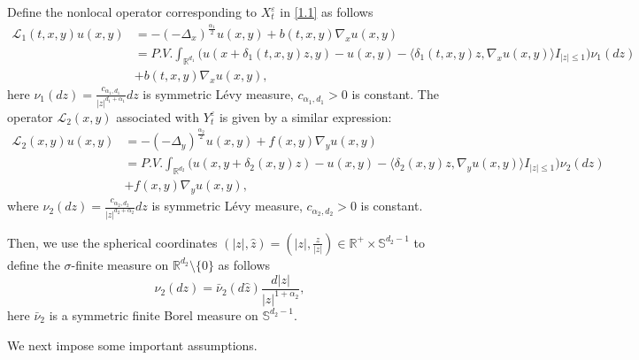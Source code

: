 \documentclass[11pt,reqno]{amsart}
\numberwithin{equation}{section}
\newcommand{\s}{\mathbb{S}}
\begin{document}
Define the nonlocal operator corresponding to $X_t^\varepsilon$ in \eqref{1.1} as follows
\begin{align*} 
	\mathcal{L}_{1}(t,x,y)u(x,y)&=	-(-\Delta_{x})^{\frac{\alpha_{1}}{2}}u(x,y)+b(t,x,y)\nabla_{x}u(x,y)\\
	&=P.V.\int_{\mathbb{R}^{d_{1}}}\Big(u(x+\delta_{1}(t,x,y)z,y)-u(x,y)-\langle\delta_{1}(t,x,y)z,\nabla_{x}u(x,y)\rangle I_{|z|\leq1}\Big)\nu_{1}(dz)\\
	&+b(t,x,y)\nabla_{x}u(x,y),
	\end{align*}
	here $\nu_{1}(dz)=\frac{c_{\alpha_{1},d_{1}}}{|z|^{d_{1}+\alpha_{1}}}dz$ is symmetric L\'{e}vy measure, $c_{\alpha_{1},d_{1}}>0$ is constant. The operator
	$ \mathcal{L}_{2}(x,y)$  associated with $Y_t^\varepsilon$  is given by a similar expression:
\begin{align}\label{l2}
	 \mathcal{L}_{2}(x,y)u(x,y)&=	-(-\Delta_{y})^{\frac{\alpha_{2}}{2}}u(x,y)+f(x,y)\nabla_{y}u(x,y)\nonumber\\
	 &=P.V.\int_{\mathbb{R}^{d_{2}}}\Big(u(x,y+\delta_{2}(x,y)z)-u(x,y)-\langle\delta_{2}(x,y)z,\nabla_{y}u(x,y)\rangle I_{|z|\leq1}\Big)\nu_{2}(dz)\nonumber\\
	 &+f(x,y)\nabla_{y}u(x,y),
	 \end{align}
where $\nu_{2}(dz)=\frac{c_{\alpha_{2},d_{2}}}{|z|^{d_{2}+\alpha_{2}}}dz$ is symmetric L\'{e}vy measure, $c_{\alpha_{2},d_{2}}>0$ is constant.

Then, we use the spherical coordinates $(|z|,\hat{z})=(|z|,\frac{z}{|z|})\in\mathbb{R}^{+}\times\s^{d_{2}-1}$ to define the $\sigma$-finite measure on $\mathbb{R}^{d_{2}}\setminus\{0\}$ as follows
$$\nu_{2}(dz)=\bar{\nu}_{2}(d\hat{z})\frac{d|z|}{|z|^{1+\alpha_{2}}},$$
here $\bar{\nu}_{2}$ is a symmetric finite Borel measure on $\mathbb{S}^{d_{2}-1}$.




We next impose some important assumptions.
\end{document}
